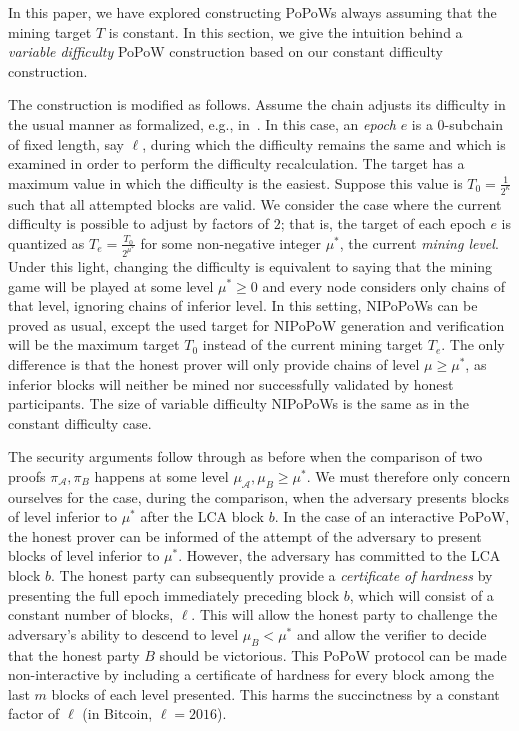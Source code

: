 \label{sec:variable}

In this paper, we have explored constructing PoPoWs always assuming that the
mining target $T$ is constant. In this section, we give the intuition behind a
\emph{variable difficulty} PoPoW construction based on our constant difficulty
construction.

The construction is modified as follows. Assume the chain adjusts its difficulty
in the usual manner as formalized, e.g., in~\cite{backbone2}. In this case, an
\emph{epoch} $e$ is a $0$-subchain of fixed length, say $\ell$, during which the
difficulty remains the same and which is examined in order to perform the
difficulty recalculation. The target has a maximum value in which the difficulty
is the easiest. Suppose this value is $T_0 = \frac{1}{2^\kappa}$ such that all
attempted blocks are valid. We consider the case where the current difficulty is
possible to adjust by factors of $2$; that is, the target of each epoch $e$ is
quantized as $T_e = \frac{T_0}{2^{\mu^*}}$ for some non-negative integer
$\mu^*$, the current \emph{mining level}. Under this light, changing the
difficulty is equivalent to saying that the mining game will be played at some
level $\mu^* \geq 0$ and every node considers only chains of that level,
ignoring chains of inferior level. In this setting, NIPoPoWs can be proved as
usual, except the used target for NIPoPoW generation and verification will be
the maximum target $T_0$ instead of the current mining target $T_e$. The only
difference is that the honest prover will only provide chains of level $\mu \geq
\mu^*$, as inferior blocks will neither be mined nor successfully validated by
honest participants. The size of variable difficulty NIPoPoWs is the same as in
the constant difficulty case.

The security arguments follow through as before when the comparison of two
proofs $\pi_\mathcal{A}, \pi_B$ happens at some level $\mu_\mathcal{A}, \mu_B
\geq \mu^*$. We must therefore only concern ourselves for the case, during the
comparison, when the adversary presents blocks of level inferior to $\mu^*$
after the LCA block $b$. In the case of an interactive PoPoW, the honest prover
can be informed of the attempt of the adversary to present blocks of level
inferior to $\mu^*$. However, the adversary has committed to the LCA block $b$.
The honest party can subsequently provide a \emph{certificate of hardness} by
presenting the full epoch immediately preceding block $b$, which will consist of
a constant number of blocks, $\ell$. This will allow the honest party to
challenge the adversary's ability to descend to level $\mu_B < \mu^*$ and allow
the verifier to decide that the honest party $B$ should be victorious. This
PoPoW protocol can be made non-interactive by including a certificate of
hardness for every block among the last $m$ blocks of each level presented. This
harms the succinctness by a constant factor of $\ell$ (in Bitcoin,
$\ell = 2016$).

